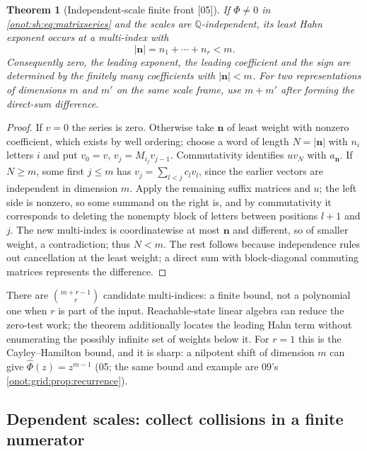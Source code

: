 \documentclass[11pt,oneside]{article}
\numberwithin{equation}{section}
\newtheorem{theorem}{Theorem}[section]
\theoremstyle{definition}
\theoremstyle{remark}
\newcommand{\Q}{\mathbb Q}
\newcommand{\src}[1]{\textup{\textsf{\small[#1]}}}
\begin{document}
\begin{theorem}[Independent-scale finite front \src{05}]\label{onot:sh:thm:front}
If $\Phi\ne0$ in \eqref{onot:sh:eq:matrixseries} and the scales are
$\Q$-independent, its least Hahn exponent occurs at a multi-index with
\begin{equation}\label{onot:sh:eq:simplex}
 |\mathbf n|=n_1+\cdots+n_r<m.
\end{equation}
Consequently zero, the leading exponent, the leading coefficient and the sign are
determined by the finitely many coefficients with $|\mathbf n|<m$. For two
representations of dimensions $m$ and $m'$ on the same scale frame, use $m+m'$
after forming the direct-sum difference.
\end{theorem}
\begin{proof}
If $v=0$ the series is zero. Otherwise take $\mathbf n$ of least weight with
nonzero coefficient, which exists by well ordering; choose a word of length
$N=|\mathbf n|$ with $n_i$ letters $i$ and put $v_0=v$, $v_j=M_{i_j}v_{j-1}$.
Commutativity identifies $uv_N$ with $a_{\mathbf n}$. If $N\ge m$, some first
$j\le m$ has $v_j=\sum_{l<j}c_lv_l$, since the earlier vectors are independent in
dimension $m$. Apply the remaining suffix matrices and $u$; the left side is
nonzero, so some summand on the right is, and by commutativity it corresponds to
deleting the nonempty block of letters between positions $l+1$ and $j$. The new
multi-index is coordinatewise at most $\mathbf n$ and different, so of smaller
weight, a contradiction; thus $N<m$. The rest follows because independence rules
out cancellation at the least weight; a direct sum with block-diagonal commuting
matrices represents the difference.
\end{proof}

There are $\binom{m+r-1}{r}$ candidate multi-indices: a finite bound, not a
polynomial one when $r$ is part of the input. Reachable-state linear algebra can
reduce the zero-test work; the theorem additionally locates the leading Hahn term
without enumerating the possibly infinite set of weights below it. For $r=1$ this
is the Cayley--Hamilton bound, and it is sharp: a nilpotent shift of dimension $m$
can give $\widehat\Phi(z)=z^{m-1}$ (05; the same bound and example are 09's
\cref{onot:grid:prop:recurrence}).

\subsection{Dependent scales: collect collisions in a finite numerator}
\end{document}
